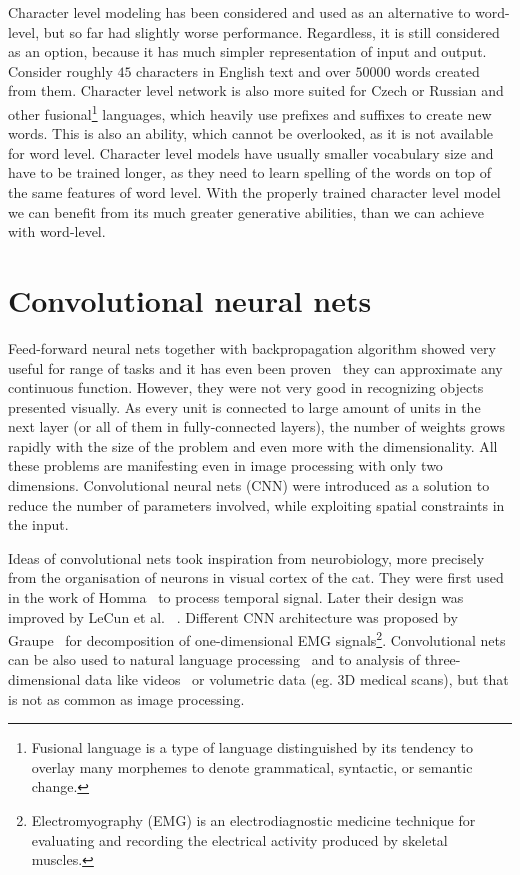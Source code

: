 
Character level modeling has been considered and used as an alternative to word-level, but so far had slightly worse performance. Regardless, it is still considered as an option, because it has much simpler representation of input and output. Consider roughly $ 45 $ characters in English text and over $ 50 000 $ words created from them. Character level network is also more suited for Czech or Russian and other fusional\footnote{Fusional language is a type of language distinguished by its tendency to overlay many morphemes to denote grammatical, syntactic, or semantic change.} languages, which heavily use prefixes and suffixes to create new words. This is also an ability, which cannot be overlooked, as it is not available for word level.
Character level models have usually smaller vocabulary size and have to be trained longer, as they need to learn spelling of the words on top of the same features of word level. With the properly trained character level model we can benefit from its much greater generative abilities, than we can achieve with word-level.

	\section{Convolutional neural nets}

Feed-forward neural nets together with backpropagation algorithm showed very useful for range of tasks and it has even been proven~\cite{cybenko:mcss,journals/nn/Hornik91} they can approximate any continuous function. However, they were not very good in recognizing objects presented visually. As every unit is connected to large amount of units in the next layer (or all of them in fully-connected layers), the number of weights grows rapidly with the size of the problem and even more with the dimensionality. All these problems are manifesting even in image processing with only two dimensions. Convolutional neural nets (CNN) were introduced as a solution to reduce the number of parameters involved, while exploiting spatial constraints in the input.

Ideas of convolutional nets took inspiration from neurobiology, more precisely from the organisation of neurons in visual cortex of the cat. They were first used in the work of Homma~\cite{NIPS1987_20} to process temporal signal. Later their design was improved by LeCun et al. ~\cite{lecun-98}. Different CNN architecture was proposed by Graupe~\cite{graupe1988} for decomposition of one-dimensional EMG signals\footnote{Electromyography (EMG) is an electrodiagnostic medicine technique for evaluating and recording the electrical activity produced by skeletal muscles.}. Convolutional nets can be also used to natural language processing~\cite{DBLP:journals/corr/Kim14f} and to analysis of three-dimensional data like videos~\cite{10.1109/TPAMI.2012.59} or volumetric data (eg. 3D medical scans), but that is not as common as image processing.

